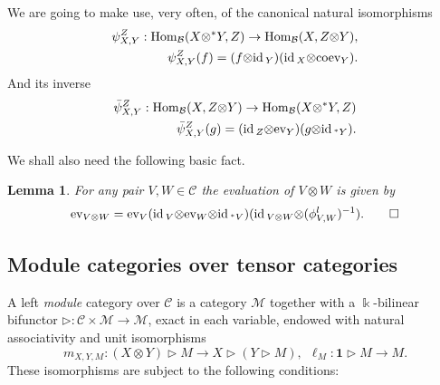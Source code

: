 \documentclass[11pt]{amsart}
\newcommand{\coev}{\mbox{coev}}
\newcommand{\ev}{\mbox{ev}}
\newcommand{\Mo}{{\mathcal M}}
\newcommand{\ca}{{\mathcal C}}
\newcommand{\ot}{{\otimes}}
\newcommand{\Bc}{{\mathcal B}}
\newcommand{\ku}{{\Bbbk}}
\newcommand{\uno}{ \mathbf{1}}
\newcommand{\id}{\mbox{\rm id\,}}
\newcommand\Hom{\operatorname{Hom}}
\renewcommand{\_}[1]{\mbox{$_{\left( #1 \right)}$}}
\theoremstyle{plain}
\numberwithin{equation}{section}
\newtheorem{lema}[teo]{Lemma}
\theoremstyle{definition}
\theoremstyle{remark}
\theoremstyle{introTheorems}
\begin{document}
We are going to make use, very often, of the canonical natural isomorphisms
\begin{align}\label{duals1}\begin{split} \psi^Z_{X,Y}:\Hom_\Bc(X\ot {}^*Y,Z)\to \Hom_\Bc(X,Z\ot Y),\\
\psi^Z_{X,Y}(f)=(f\ot\id_Y)(\id_X\ot \coev_Y).
\end{split}
\end{align}
And its inverse
\begin{align}\label{duals2}\begin{split} \bar{\psi}^Z_{X,Y}:\Hom_\Bc(X,Z\ot Y)\to \Hom_\Bc(X\ot {}^*Y,Z)\\
\bar{\psi}^Z_{X,Y}(g)=(\id_Z\ot\ev_Y)(g\ot\id_{{}^*Y}).\end{split}
\end{align}

We shall also need the following basic fact.
\begin{lema} For any pair $V,W\in \ca$ the evaluation of $V\ot W$ is given by
\begin{equation}\label{evaluation-tensor-prod} \ev_{V\ot W} = \ev_V(\id_V\ot \ev_W\ot \id_{{}^*V})(\id_{V\ot W} \ot (\phi^l_{V,W})^{-1}).\qed
\end{equation}
\end{lema}


\subsection{Module categories over tensor categories}
 A  left \emph{module} category over  
$\ca$ is a  category $\Mo$ together with a $\ku$-bilinear 
bifunctor $\rhd: \ca \times \Mo \to \Mo$, exact in each variable,  endowed with 
 natural associativity
and unit isomorphisms 
$$m_{X,Y,M}: (X\otimes Y)\triangleright   M \to X\triangleright  
(Y\triangleright M), \ \ \ell_M: \uno \triangleright  M\to M.$$ 
These isomorphisms are subject to the following conditions: 
\end{document}
